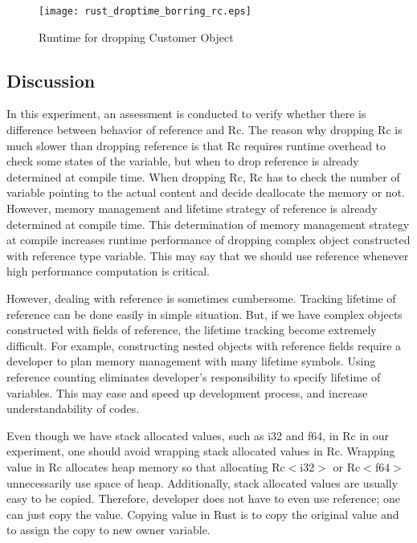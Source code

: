 \begin{figure}[htb!]
    \texttt{[image: rust\_droptime\_borring\_rc.eps]}
    \caption{Runtime for dropping Customer Object}
    \label{fig:rc_ref}
\end{figure}


\subsection{Discussion}
In this experiment, an assessment is conducted to verify whether there is difference between behavior of reference and Rc.
The reason why dropping Rc is much slower than dropping reference is that Rc requires runtime overhead to check some states of the variable, 
but when to drop reference is already determined at compile time. When dropping Rc, Rc has to check the number of variable pointing to the actual content and decide 
deallocate the memory or not. However, memory management and lifetime strategy of reference is already determined at compile time.
This determination of memory management strategy at compile increases runtime performance of dropping complex object constructed with reference type variable.
This may say that we should use reference whenever high performance computation is critical.

However, dealing with reference is sometimes cumbersome. Tracking lifetime of reference can be done easily in simple situation. 
But, if we have complex objects constructed with fields of reference, the lifetime tracking become extremely difficult. 
For example, constructing nested objects with reference fields require a developer to plan memory management with many lifetime symbols. 
Using reference counting eliminates developer's responsibility to specify lifetime of variables. 
This may ease and speed up development process, and increase understandability of codes.

Even though we have stack allocated values, such as i32 and f64, in Rc in our experiment, 
one should avoid wrapping stack allocated values in Rc. Wrapping value in Rc allocates heap memory so that allocating Rc$<$i32$>$ or Rc$<$f64$>$ unnecessarily use space of 
heap. Additionally, stack allocated values are usually easy to be copied. Therefore, developer does not have to even use reference; one can just copy the value. 
Copying value in Rust is to copy the original value and to assign the copy to new owner variable. 